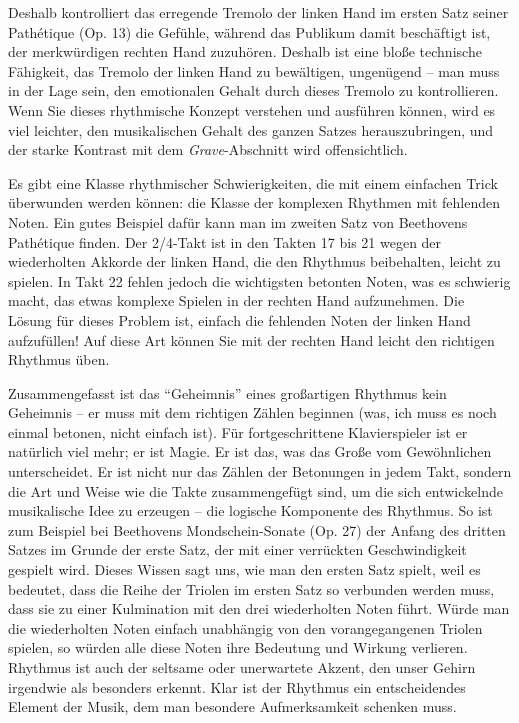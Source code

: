 Deshalb kontrolliert das erregende Tremolo der linken Hand im ersten Satz seiner Pathétique (Op. 13) die Gefühle, während das Publikum damit beschäftigt ist, der merkwürdigen rechten Hand zuzuhören.
Deshalb ist eine bloße technische Fähigkeit, das Tremolo der linken Hand zu bewältigen, ungenügend -- man muss in der Lage sein, den emotionalen Gehalt durch dieses Tremolo zu kontrollieren.
Wenn Sie dieses rhythmische Konzept verstehen und ausführen können, wird es viel leichter, den musikalischen Gehalt des ganzen Satzes herauszubringen, und der starke Kontrast mit dem \textit{Grave}-Abschnitt wird offensichtlich.

Es gibt eine Klasse rhythmischer Schwierigkeiten, die mit einem einfachen Trick überwunden werden können: die Klasse der komplexen Rhythmen mit fehlenden Noten.
Ein gutes Beispiel dafür kann man im zweiten Satz von Beethovens Pathétique finden.
Der 2/4-Takt ist in den Takten 17 bis 21 wegen der wiederholten Akkorde der linken Hand, die den Rhythmus beibehalten, leicht zu spielen.
In Takt 22 fehlen jedoch die wichtigsten betonten Noten, was es schwierig macht, das etwas komplexe Spielen in der rechten Hand aufzunehmen.
Die Lösung für dieses Problem ist, einfach die fehlenden Noten der linken Hand aufzufüllen!
Auf diese Art können Sie mit der rechten Hand leicht den richtigen Rhythmus üben.

Zusammengefasst ist das \enquote{Geheimnis} eines großartigen Rhythmus kein Geheimnis -- er muss mit dem richtigen Zählen beginnen (was, ich muss es noch einmal betonen, nicht einfach ist).
Für fortgeschrittene Klavierspieler ist er natürlich viel mehr; er ist Magie.
Er ist das, was das Große vom Gewöhnlichen unterscheidet.
Er ist nicht nur das Zählen der Betonungen in jedem Takt, sondern die Art und Weise wie die Takte zusammengefügt sind, um die sich entwickelnde musikalische Idee zu erzeugen -- die logische Komponente des Rhythmus.
So ist zum Beispiel bei Beethovens Mondschein-Sonate (Op. 27) der Anfang des dritten Satzes im Grunde der erste Satz, der mit einer verrückten Geschwindigkeit gespielt wird.
Dieses Wissen sagt uns, wie man den ersten Satz spielt, weil es bedeutet, dass die Reihe der Triolen im ersten Satz so verbunden werden muss, dass sie zu einer Kulmination mit den drei wiederholten Noten führt.
Würde man die wiederholten Noten einfach unabhängig von den vorangegangenen Triolen spielen, so würden alle diese Noten ihre Bedeutung und Wirkung verlieren.
Rhythmus ist auch der seltsame oder unerwartete Akzent, den unser Gehirn irgendwie als besonders erkennt.
Klar ist der Rhythmus ein entscheidendes Element der Musik, dem man besondere Aufmerksamkeit schenken muss.
 


